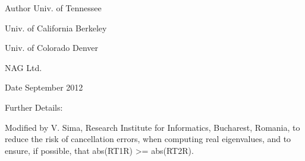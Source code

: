 \begin{DoxyAuthor}{Author}
Univ. of Tennessee 

Univ. of California Berkeley 

Univ. of Colorado Denver 

N\+A\+G Ltd. 
\end{DoxyAuthor}
\begin{DoxyDate}{Date}
September 2012 
\end{DoxyDate}
\begin{DoxyParagraph}{Further Details\+: }
\begin{DoxyVerb}  Modified by V. Sima, Research Institute for Informatics, Bucharest,
  Romania, to reduce the risk of cancellation errors,
  when computing real eigenvalues, and to ensure, if possible, that
  abs(RT1R) >= abs(RT2R).\end{DoxyVerb}
 
\end{DoxyParagraph}
